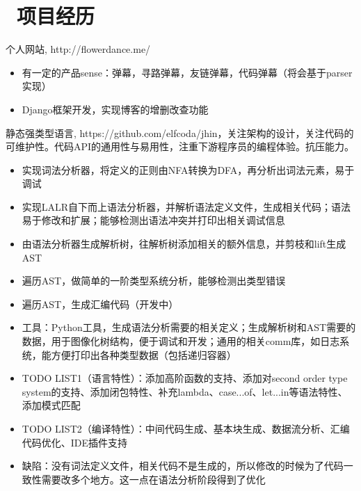 \documentclass{resume}
\begin{document}
\section{\faCode\ 项目经历}
\begin{onehalfspacing}
个人网站, http://flowerdance.me/
\begin{itemize}
  \item 有一定的产品sense：弹幕，寻路弹幕，友链弹幕，代码弹幕（将会基于parser实现）
  \item Django框架开发，实现博客的增删改查功能
\end{itemize}
\end{onehalfspacing}

\begin{onehalfspacing}
静态强类型语言, https://github.com/elfcoda/jhin，关注架构的设计，关注代码的可维护性。代码API的通用性与易用性，注重下游程序员的编程体验。抗压能力。
\begin{itemize}
  \item 实现词法分析器，将定义的正则由NFA转换为DFA，再分析出词法元素，易于调试
  \item 实现LALR自下而上语法分析器，并解析语法定义文件，生成相关代码；语法易于修改和扩展；能够检测出语法冲突并打印出相关调试信息
  \item 由语法分析器生成解析树，往解析树添加相关的额外信息，并剪枝和lift生成AST
  \item 遍历AST，做简单的一阶类型系统分析，能够检测出类型错误
  \item 遍历AST，生成汇编代码（开发中）
  \item 工具：Python工具，生成语法分析需要的相关定义；生成解析树和AST需要的数据，用于图像化树结构，便于调试和开发；通用的相关comm库，如日志系统，能方便打印出各种类型数据（包括递归容器）
  \item TODO LIST1（语言特性）：添加高阶函数的支持、添加对second order type system的支持、添加闭包特性、补充lambda、case...of、let...in等语法特性、添加模式匹配
  \item TODO LIST2（编译特性）：中间代码生成、基本块生成、数据流分析、汇编代码优化、IDE插件支持
  \item 缺陷：没有词法定义文件，相关代码不是生成的，所以修改的时候为了代码一致性需要改多个地方。这一点在语法分析阶段得到了优化
\end{itemize}
\end{onehalfspacing}
\end{document}
